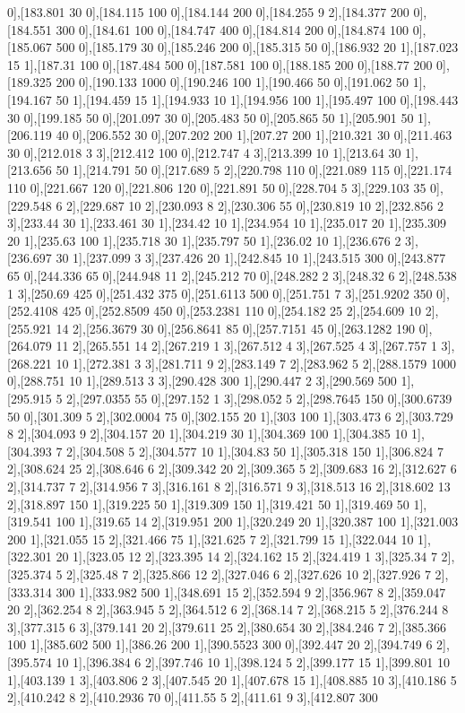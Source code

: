 {0],[183.801 30 0],[184.115 100 0],[184.144 200 0],[184.255 9 2],[184.377 200 0],[184.551 300 0],[184.61 100 0],[184.747 400 0],[184.814 200 0],[184.874 100 0],[185.067 500 0],[185.179 30 0],[185.246 200 0],[185.315 50 0],[186.932 20 1],[187.023 15 1],[187.31 100 0],[187.484 500 0],[187.581 100 0],[188.185 200 0],[188.77 200 0],[189.325 200 0],[190.133 1000 0],[190.246 100 1],[190.466 50 0],[191.062 50 1],[194.167 50 1],[194.459 15 1],[194.933 10 1],[194.956 100 1],[195.497 100 0],[198.443 30 0],[199.185 50 0],[201.097 30 0],[205.483 50 0],[205.865 50 1],[205.901 50 1],[206.119 40 0],[206.552 30 0],[207.202 200 1],[207.27 200 1],[210.321 30 0],[211.463 30 0],[212.018 3 3],[212.412 100 0],[212.747 4 3],[213.399 10 1],[213.64 30 1],[213.656 50 1],[214.791 50 0],[217.689 5 2],[220.798 110 0],[221.089 115 0],[221.174 110 0],[221.667 120 0],[221.806 120 0],[221.891 50 0],[228.704 5 3],[229.103 35 0],[229.548 6 2],[229.687 10 2],[230.093 8 2],[230.306 55 0],[230.819 10 2],[232.856 2 3],[233.44 30 1],[233.461 30 1],[234.42 10 1],[234.954 10 1],[235.017 20 1],[235.309 20 1],[235.63 100 1],[235.718 30 1],[235.797 50 1],[236.02 10 1],[236.676 2 3],[236.697 30 1],[237.099 3 3],[237.426 20 1],[242.845 10 1],[243.515 300 0],[243.877 65 0],[244.336 65 0],[244.948 11 2],[245.212 70 0],[248.282 2 3],[248.32 6 2],[248.538 1 3],[250.69 425 0],[251.432 375 0],[251.6113 500 0],[251.751 7 3],[251.9202 350 0],[252.4108 425 0],[252.8509 450 0],[253.2381 110 0],[254.182 25 2],[254.609 10 2],[255.921 14 2],[256.3679 30 0],[256.8641 85 0],[257.7151 45 0],[263.1282 190 0],[264.079 11 2],[265.551 14 2],[267.219 1 3],[267.512 4 3],[267.525 4 3],[267.757 1 3],[268.221 10 1],[272.381 3 3],[281.711 9 2],[283.149 7 2],[283.962 5 2],[288.1579 1000 0],[288.751 10 1],[289.513 3 3],[290.428 300 1],[290.447 2 3],[290.569 500 1],[295.915 5 2],[297.0355 55 0],[297.152 1 3],[298.052 5 2],[298.7645 150 0],[300.6739 50 0],[301.309 5 2],[302.0004 75 0],[302.155 20 1],[303 100 1],[303.473 6 2],[303.729 8 2],[304.093 9 2],[304.157 20 1],[304.219 30 1],[304.369 100 1],[304.385 10 1],[304.393 7 2],[304.508 5 2],[304.577 10 1],[304.83 50 1],[305.318 150 1],[306.824 7 2],[308.624 25 2],[308.646 6 2],[309.342 20 2],[309.365 5 2],[309.683 16 2],[312.627 6 2],[314.737 7 2],[314.956 7 3],[316.161 8 2],[316.571 9 3],[318.513 16 2],[318.602 13 2],[318.897 150 1],[319.225 50 1],[319.309 150 1],[319.421 50 1],[319.469 50 1],[319.541 100 1],[319.65 14 2],[319.951 200 1],[320.249 20 1],[320.387 100 1],[321.003 200 1],[321.055 15 2],[321.466 75 1],[321.625 7 2],[321.799 15 1],[322.044 10 1],[322.301 20 1],[323.05 12 2],[323.395 14 2],[324.162 15 2],[324.419 1 3],[325.34 7 2],[325.374 5 2],[325.48 7 2],[325.866 12 2],[327.046 6 2],[327.626 10 2],[327.926 7 2],[333.314 300 1],[333.982 500 1],[348.691 15 2],[352.594 9 2],[356.967 8 2],[359.047 20 2],[362.254 8 2],[363.945 5 2],[364.512 6 2],[368.14 7 2],[368.215 5 2],[376.244 8 3],[377.315 6 3],[379.141 20 2],[379.611 25 2],[380.654 30 2],[384.246 7 2],[385.366 100 1],[385.602 500 1],[386.26 200 1],[390.5523 300 0],[392.447 20 2],[394.749 6 2],[395.574 10 1],[396.384 6 2],[397.746 10 1],[398.124 5 2],[399.177 15 1],[399.801 10 1],[403.139 1 3],[403.806 2 3],[407.545 20 1],[407.678 15 1],[408.885 10 3],[410.186 5 2],[410.242 8 2],[410.2936 70 0],[411.55 5 2],[411.61 9 3],[412.807 300 }
